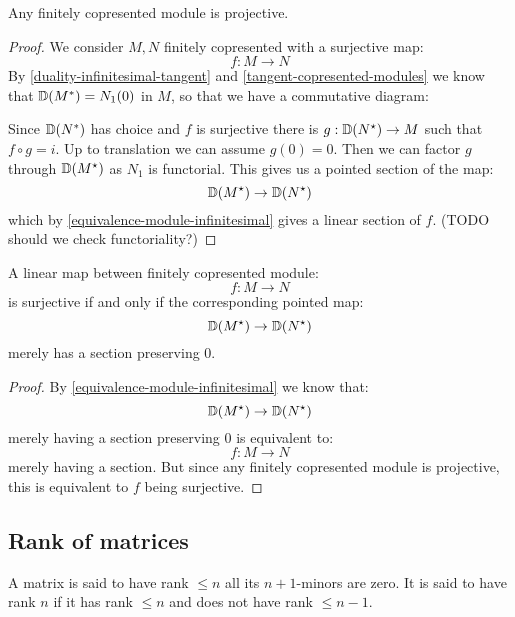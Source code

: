 \begin{lemma}
Any finitely copresented module is projective.
\end{lemma}

\begin{proof}
We consider $M,N$ finitely copresented with a surjective map:
\[f:M\to N\]
By \cref{duality-infinitesimal-tangent} and \cref{tangent-copresented-modules} we know that $\mathbb{D}(M^*) = N_1(0)$ in $M$, so that we have a commutative diagram:
\begin{center}
\end{center}
Since $\mathbb{D}(N^*)$ has choice and $f$ is surjective there is $g:\mathbb{D}(N^\star)\to M$ such that $f\circ g = i$. Up to translation we can assume $g(0) = 0$.
Then we can factor $g$ through $\mathbb{D}(M^\star)$ as $N_1$ is functorial. This gives us a pointed section of the map:
\[\mathbb{D}(M^\star) \to \mathbb{D}(N^\star)\]
which by \cref{equivalence-module-infinitesimal} gives a linear section of $f$. (TODO should we check functoriality?)
\end{proof}

\begin{lemma}\label{neighborhood-tangent-correspondence-smooth}
A linear map between finitely copresented module:
\[f:M\to N\]
is surjective if and only if the corresponding pointed map:
\[\mathbb{D}(M^\star) \to \mathbb{D}(N^\star)\]
merely has a section preserving $0$.
\end{lemma}

\begin{proof}
By \cref{equivalence-module-infinitesimal} we know that:
\[\mathbb{D}(M^\star) \to \mathbb{D}(N^\star)\]
merely having a section preserving $0$ is equivalent to:
\[f:M\to N\]
merely having a section. But since any finitely copresented module is projective, this is equivalent to $f$ being surjective.
\end{proof}


\subsection{Rank of matrices}

\begin{definition}
A matrix is said to have rank $\leq n$ all its $n+1$-minors are zero. It is said to have rank $n$ if it has rank $\leq n$ and does not have rank $\leq n-1$.
\end{definition}

